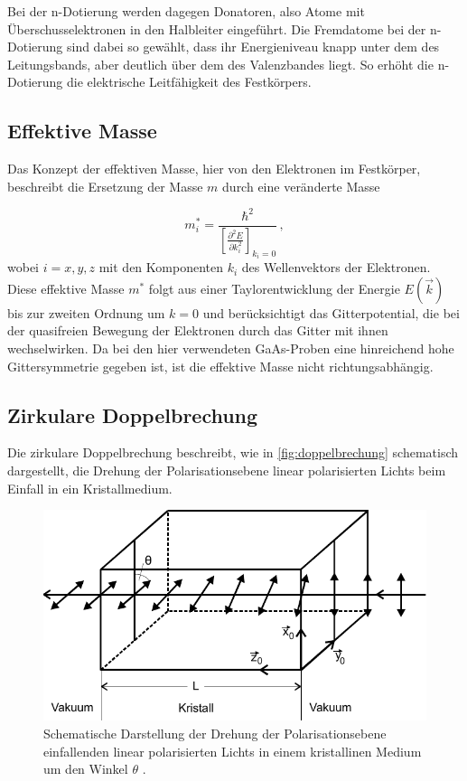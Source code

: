 Bei der n-Dotierung werden dagegen Donatoren, also Atome mit Überschusselektronen in den Halbleiter eingeführt.
Die Fremdatome bei der  n-Dotierung sind dabei so gewählt, dass ihr Energieniveau knapp unter dem des Leitungsbands,
aber deutlich über dem des Valenzbandes liegt.
So erhöht die n-Dotierung die elektrische Leitfähigkeit des Festkörpers.


\subsection{Effektive Masse}

Das Konzept der effektiven Masse, hier von den Elektronen im Festkörper, beschreibt die Ersetzung der Masse $m$ durch eine veränderte Masse

\begin{equation}
    m^*_i = \frac{\hbar^2}{\left[\frac{\partial^2 E}{\partial k^2_i} \right]_{k_i=0}} \,,
    \label{eq:effektivemasse}
\end{equation}
wobei $i = x,y,z$ mit den Komponenten $k_i$ des Wellenvektors der Elektronen.
Diese effektive Masse $m^*$ folgt aus einer Taylorentwicklung der Energie $E(\vec{k})$ bis zur zweiten Ordnung um $k=0$ und berücksichtigt das Gitterpotential,
die bei der quasifreien Bewegung der Elektronen durch das Gitter mit ihnen wechselwirken.
Da bei den hier verwendeten GaAs-Proben eine hinreichend hohe Gittersymmetrie gegeben ist, ist die effektive Masse nicht richtungsabhängig.


\subsection{Zirkulare Doppelbrechung}

Die zirkulare Doppelbrechung beschreibt, wie in \autoref{fig:doppelbrechung} schematisch dargestellt,
die Drehung der Polarisationsebene linear polarisierten Lichts beim Einfall in ein Kristallmedium.

\begin{figure}[H]
    \centering
    \includegraphics[width=.6\textwidth]{figures/doppelbrechung.pdf}
    \caption{Schematische Darstellung der Drehung der Polarisationsebene einfallenden linear polarisierten Lichts in einem kristallinen Medium um den Winkel $\theta$ \cite{doppbre}.}
    \label{fig:doppelbrechung}
\end{figure}

